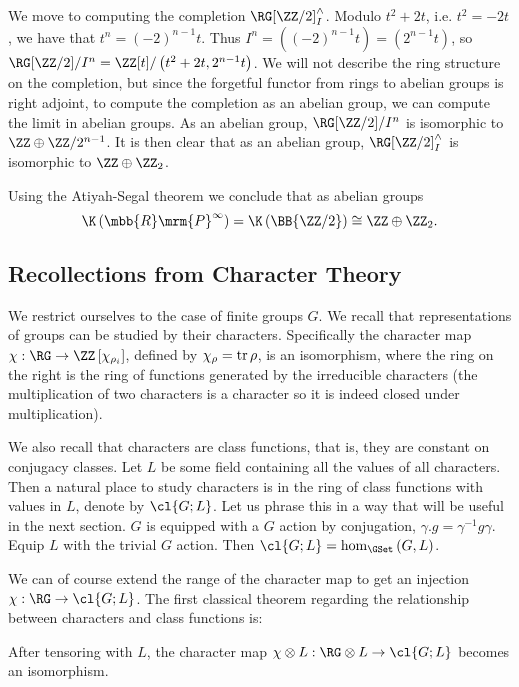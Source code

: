 We move to computing the completion $\RG[\ZZ/2]_I^\wedge$.
Modulo $t^2+2t$, i.e. $t^2 = -2t$, we have that $t^n = \left(-2\right)^{n-1} t$.
Thus $I^n = \left(\left(-2\right)^{n-1} t\right) = \left(2^{n-1} t\right)$, so $\RG[\ZZ/2]/I^n = \ZZ[t]/\left(t^2+2t, 2^{n-1} t\right)$.
We will not describe the ring structure on the completion, but since the forgetful functor from rings to abelian groups is right adjoint, to compute the completion as an abelian group, we can compute the limit in abelian groups.
As an abelian group, $\RG[\ZZ/2]/I^n$ is isomorphic to $\ZZ \oplus \ZZ/2^{n-1}$.
It is then clear that as an abelian group, $\RG[\ZZ/2]_I^\wedge$ is isomorphic to $\ZZ \oplus \ZZ_2$.

Using the Atiyah-Segal theorem we conclude that as abelian groups
$$
\K\left({\mbb{R}\mrm{P}}^\infty\right)
= \K\left(\BB{\ZZ/2}\right)
\cong \ZZ \oplus \ZZ_2.
$$




\subsection{Recollections from Character Theory}

We restrict ourselves to the case of finite groups $G$.
We recall that representations of groups can be studied by their characters.
Specifically the character map $\chi: \RG \to \ZZ\left[\chi_{\rho_i}\right]$, defined by $\chi_\rho = \operatorname{tr} \rho$, is an isomorphism, where the ring on the right is the ring of functions generated by the irreducible characters (the multiplication of two characters is a character so it is indeed closed under multiplication).

We also recall that characters are class functions, that is, they are constant on conjugacy classes.
Let $L$ be some field containing all the values of all characters.
Then a natural place to study characters is in the ring of class functions with values in $L$, denote by $\cl{G;L}$.
Let us phrase this in a way that will be useful in the next section.
$G$ is equipped with a $G$ action by conjugation, $\gamma.g = \gamma^{-1} g \gamma$.
Equip $L$ with the trivial $G$ action.
Then $\cl{G;L} = \hom_{\GSet}\left(G, L\right)$.

We can of course extend the range of the character map to get an injection $\chi: \RG \to \cl{G;L}$.
The first classical theorem regarding the relationship between characters and class functions is:

\begin{theorem}\label{char-1}
	After tensoring with $L$, the character map $\chi \otimes L: \RG \otimes L \to \cl{G; L}$ becomes an isomorphism.
\end{theorem}

